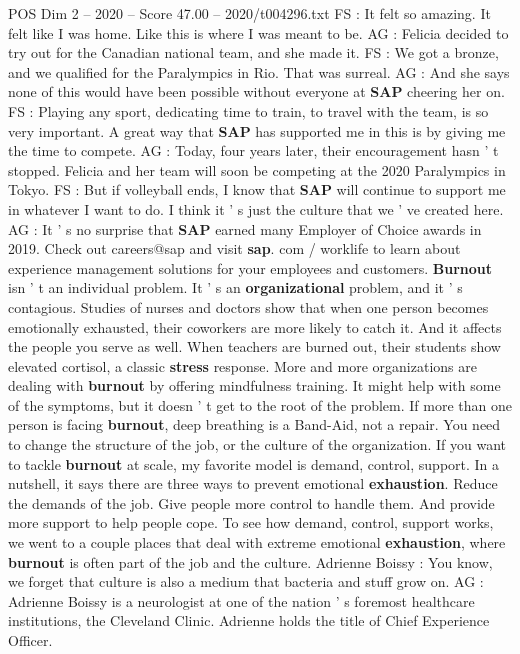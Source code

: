 \begin{textsample}{POS Dim 2 – 2020 – Score 47.00 – 2020/t004296.txt}
FS : It felt so amazing.
It felt like I was home.
Like this is where I was meant to be.
AG : Felicia decided to try out for the Canadian national team, and she made it.
FS : We got a bronze, and we qualified for the Paralympics in Rio.
That was surreal.
AG : And she says none of this would have been possible without everyone at \textbf{SAP} cheering her on.
FS : Playing any sport, dedicating time to train, to travel with the team, is so very important.
A great way that \textbf{SAP} has supported me in this is by giving me the time to compete.
AG : Today, four years later, their encouragement hasn ' t stopped.
Felicia and her team will soon be competing at the 2020 Paralympics in Tokyo.
FS : But if volleyball ends, I know that \textbf{SAP} will continue to support me in whatever I want to do.
I think it ' s just the culture that we ' ve created here.
AG : It ' s no surprise that \textbf{SAP} earned many Employer of Choice awards in 2019.
Check out careers@sap and visit \textbf{sap}. com / worklife to learn about experience management solutions for your employees and customers. \textbf{Burnout} isn ' t an individual problem.
It ' s an \textbf{organizational} problem, and it ' s contagious.
Studies of nurses and doctors show that when one person becomes emotionally exhausted, their coworkers are more likely to catch it.
And it affects the people you serve as well.
When teachers are burned out, their students show elevated cortisol, a classic \textbf{stress} response.
More and more organizations are dealing with \textbf{burnout} by offering mindfulness training.
It might help with some of the symptoms, but it doesn ' t get to the root of the problem.
If more than one person is facing \textbf{burnout}, deep breathing is a Band-Aid, not a repair.
You need to change the structure of the job, or the culture of the organization.
If you want to tackle \textbf{burnout} at scale, my favorite model is demand, control, support.
In a nutshell, it says there are three ways to prevent emotional \textbf{exhaustion}.
Reduce the demands of the job.
Give people more control to handle them.
And provide more support to help people cope.
To see how demand, control, support works, we went to a couple places that deal with extreme emotional \textbf{exhaustion}, where \textbf{burnout} is often part of the job and the culture.
Adrienne Boissy : You know, we forget that culture is also a medium that bacteria and stuff grow on.
AG : Adrienne Boissy is a neurologist at one of the nation ' s foremost healthcare institutions, the Cleveland Clinic.
Adrienne holds the title of Chief Experience Officer.

\end{textsample}

